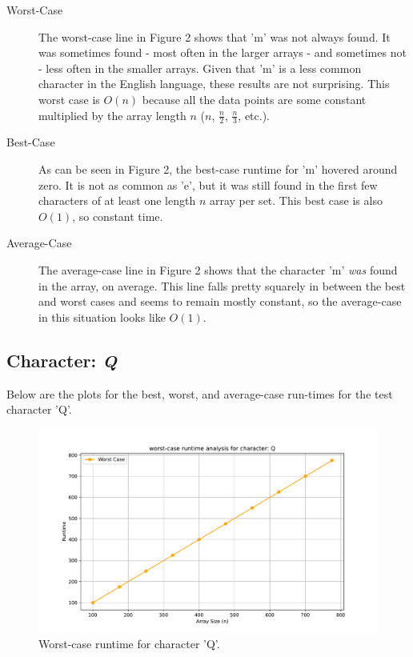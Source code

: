 \documentclass{article}
\begin{document}
\begin{description}
    \item[Worst-Case] The worst-case line in Figure 2 shows that 'm' was not always found. It was sometimes found - most often in the larger arrays - and sometimes not - less often in the smaller arrays. Given that 'm' is a less common character in the English language, these results are not surprising. This worst case is $O(n)$ because all the data points are some constant multiplied by the array length $n$ ($n$, $\frac{n}{2}$, $\frac{n}{3}$, etc.).
    \item[Best-Case] As can be seen in Figure 2, the best-case runtime for 'm' hovered around zero. It is not as common as 'e', but it was still found in the first few characters of at least one length $n$ array per set. This best case is also $O(1)$, so constant time.
    \item[Average-Case] The average-case line in Figure 2 shows that the character 'm' \textit{was} found in the array, on average. This line falls pretty squarely in between the best and worst cases and seems to remain mostly constant, so the average-case in this situation looks like $O(1)$. 
\end{description}

\subsection{Character: \textit{Q}}
Below are the plots for the best, worst, and average-case run-times for the test character 'Q'.
	
	\begin{figure}[H]
		\centering
		\includegraphics[width=\textwidth]{runtime_analysis_worst_Q.pdf}
		\caption{Worst-case runtime for character 'Q'.}
	\end{figure}
\end{document}
